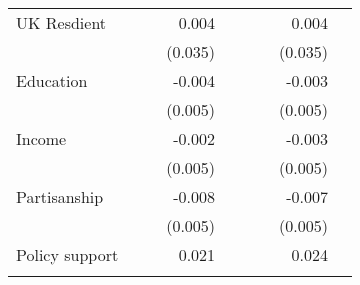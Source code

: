 \documentclass{article}
\begin{document}
\begin{table}[!h]
\begin{tabular}{lllllllll}
\multicolumn{1}{l}{UK Resdient} &
  \multicolumn{1}{r}{} &
  \multicolumn{1}{l}{} &
  \multicolumn{1}{r}{0.004} &
  \multicolumn{1}{l}{} &
  \multicolumn{1}{r}{} &
  \multicolumn{1}{l}{} &
  \multicolumn{1}{r}{0.004} &
  \multicolumn{1}{l}{} \\
\multicolumn{1}{l}{} &
  \multicolumn{1}{r}{} &
  \multicolumn{1}{l}{} &
  \multicolumn{1}{r}{(0.035)} &
  \multicolumn{1}{l}{} &
  \multicolumn{1}{r}{} &
  \multicolumn{1}{l}{} &
  \multicolumn{1}{r}{(0.035)} &
  \multicolumn{1}{l}{} \\
\multicolumn{1}{l}{Education} &
  \multicolumn{1}{r}{} &
  \multicolumn{1}{l}{} &
  \multicolumn{1}{r}{-0.004} &
  \multicolumn{1}{l}{} &
  \multicolumn{1}{r}{} &
  \multicolumn{1}{l}{} &
  \multicolumn{1}{r}{-0.003} &
  \multicolumn{1}{l}{} \\
\multicolumn{1}{l}{} &
  \multicolumn{1}{r}{} &
  \multicolumn{1}{l}{} &
  \multicolumn{1}{r}{(0.005)} &
  \multicolumn{1}{l}{} &
  \multicolumn{1}{r}{} &
  \multicolumn{1}{l}{} &
  \multicolumn{1}{r}{(0.005)} &
  \multicolumn{1}{l}{} \\
\multicolumn{1}{l}{Income} &
  \multicolumn{1}{r}{} &
  \multicolumn{1}{l}{} &
  \multicolumn{1}{r}{-0.002} &
  \multicolumn{1}{l}{} &
  \multicolumn{1}{r}{} &
  \multicolumn{1}{l}{} &
  \multicolumn{1}{r}{-0.003} &
  \multicolumn{1}{l}{} \\
\multicolumn{1}{l}{} &
  \multicolumn{1}{r}{} &
  \multicolumn{1}{l}{} &
  \multicolumn{1}{r}{(0.005)} &
  \multicolumn{1}{l}{} &
  \multicolumn{1}{r}{} &
  \multicolumn{1}{l}{} &
  \multicolumn{1}{r}{(0.005)} &
  \multicolumn{1}{l}{} \\
\multicolumn{1}{l}{Partisanship} &
  \multicolumn{1}{r}{} &
  \multicolumn{1}{l}{} &
  \multicolumn{1}{r}{-0.008} &
  \multicolumn{1}{l}{} &
  \multicolumn{1}{r}{} &
  \multicolumn{1}{l}{} &
  \multicolumn{1}{r}{-0.007} &
  \multicolumn{1}{l}{} \\
\multicolumn{1}{l}{} &
  \multicolumn{1}{r}{} &
  \multicolumn{1}{l}{} &
  \multicolumn{1}{r}{(0.005)} &
  \multicolumn{1}{l}{} &
  \multicolumn{1}{r}{} &
  \multicolumn{1}{l}{} &
  \multicolumn{1}{r}{(0.005)} &
  \multicolumn{1}{l}{} \\
\multicolumn{1}{l}{Policy support} &
  \multicolumn{1}{r}{} &
  \multicolumn{1}{l}{} &
  \multicolumn{1}{r}{0.021} &
  \multicolumn{1}{l}{} &
  \multicolumn{1}{r}{} &
  \multicolumn{1}{l}{} &
  \multicolumn{1}{r}{0.024} &
  \multicolumn{1}{l}{} \\
\multicolumn{1}{l}{} &
  \multicolumn{1}{r}{} &
  \multicolumn{1}{l}{} &

\end{tabular}
\end{table}
\end{document}
